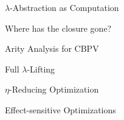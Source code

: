 \documentclass[letterpaper,10pt,aspectratio=169,dvipsnames]{beamer}
\begin{document}
\begin{frame}{\(\lambda\)-Abstraction as Computation}
\end{frame}

\begin{frame}{Where has the closure gone?}
\end{frame}

\begin{frame}{Arity Analysis for \ac{CBPV}}
\end{frame}

\begin{frame}{Full \(\lambda\)-Lifting}
\end{frame}

\begin{frame}{\(\eta\)-Reducing Optimization}
\end{frame}

\begin{frame}{Effect-sensitive Optimizations}
\end{frame}
\end{document}
